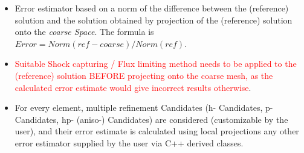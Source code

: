 \documentclass{beamer}
\begin{document}
\begin{frame}
\begin{center}
\begin{figure}[t]
\end{figure}
\end{center}
\vspace{-8pt}
\begin{itemize}
\item
	Error estimator based on a norm of the difference between the (reference) solution and the solution obtained by projection of the (reference) solution onto the \emph{coarse Space}. The formula is $Error = Norm\left(ref-coarse\right) / Norm\left(ref\right)$.
\item
\textcolor{red}{Suitable Shock capturing / Flux limiting method needs to be applied to the (reference) solution BEFORE projecting onto the coarse mesh, as the calculated error estimate would give incorrect results otherwise}.
\item
	For every element, multiple refinement Candidates (h- Candidates, p- Candidates, hp- (aniso-) Candidates) are considered 
(customizable by the user), and their error estimate is calculated using local projections any other error estimator supplied by the user via C++ derived classes.
\end{itemize}
\end{frame}
\end{document}
